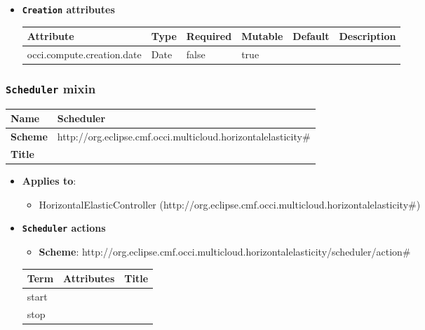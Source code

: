 \begin{itemize}
\item \textbf{\texttt{Creation} attributes}

\begin{tabularx}{\textwidth}{|l|l|p{1.4cm}|p{1.3cm}|l|X|}
  \hline
  \textbf{Attribute} & \textbf{Type} & \textbf{Required} & \textbf{Mutable} & \textbf{Default} & \textbf{Description} \\
  \hline  
  occi.compute.creation.date & Date & false & true &  &  \\
  \hline
\end{tabularx}
\end{itemize}


 
\subsubsection{\texttt{Scheduler} mixin}
\begin{center}
\begin{tabular}{|l|l|}
  \hline
  \textbf{Name} & Scheduler \\
  \hline  
  \textbf{Scheme} & http://org.eclipse.cmf.occi.multicloud.horizontalelasticity\# \\
  \hline
  \textbf{Title} &  \\
  \hline
\end{tabular}
\end{center}
\begin{itemize}
\item \textbf{Applies to}:
\begin{itemize}
	\item HorizontalElasticController (http://org.eclipse.cmf.occi.multicloud.horizontalelasticity\#)
\end{itemize}
\end{itemize} 


\begin{itemize}
\item \textbf{\texttt{Scheduler} actions}

\begin{itemize}
	\item \textbf{Scheme}: http://org.eclipse.cmf.occi.multicloud.horizontalelasticity/scheduler/action\#
\end{itemize}

\begin{center}
\begin{tabular}{|l|l|l|}
  \hline
  \textbf{Term}  & \textbf{Attributes} & \textbf{Title} \\
  \hline  
  start & &  \\
  \hline
  stop & &  \\
  \hline
\end{tabular}
\end{center}
\end{itemize}


